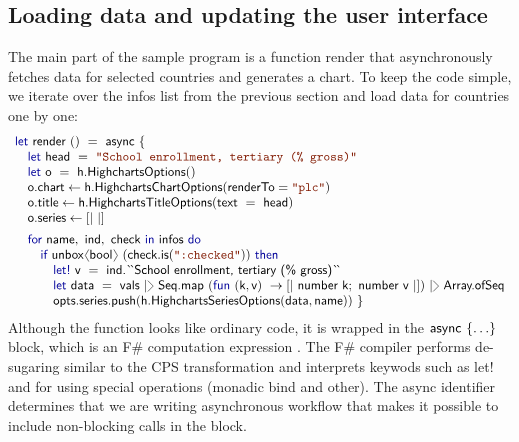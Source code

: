 \documentclass[submission,copyright,creativecommons]{eptcs}
\newcommand{\langl}{\begin{picture}(4.5,7)
\put(1.1,2.5){\rotatebox{60}{\line(1,0){5.5}}}
\put(1.1,2.5){\rotatebox{300}{\line(1,0){5.5}}}
\end{picture}}
\newcommand{\rangl}{\begin{picture}(4.5,7)
\put(.9,2.5){\rotatebox{120}{\line(1,0){5.5}}}
\put(.9,2.5){\rotatebox{240}{\line(1,0){5.5}}}
\end{picture}}
\newcommand{\rang}{\begin{picture}(5,7)
\put(.1,2.5){\rotatebox{135}{\line(1,0){6.0}}}
\put(.1,2.5){\rotatebox{225}{\line(1,0){6.0}}}
\end{picture}}
\newcommand{\kvd}[1]{\textnormal{\textcolor{kvdclr}{\sffamily #1}}}
\newcommand{\str}[1]{\textnormal{\textcolor{strclr}{\ttfamily "#1"}}}
\newcommand{\ident}[1]{\textnormal{\sffamily #1}}
\newcommand{\lident}[1]{\textnormal{\sffamily 
  \`{}\hspace{-0.25em}\`{}\hspace{-0.1em}#1\`{}\hspace{-0.25em}\`{}}}
\begin{document}

\subsection{Loading data and updating the user interface}

The main part of the sample program is a function \ident{render} that asynchronously fetches 
data for selected countries and generates a chart. To keep the code simple, we iterate over the 
\ident{infos} list from the previous section and load data for countries one by one:
%
\begin{equation*}
\begin{array}{lll}
 \kvd{let}~\ident{render}~()~=~\ident{async}~\{ \\
 \quad \kvd{let}~\ident{head}~=~\str{School enrollment, tertiary (\% gross)} \\
 \quad \kvd{let}~\ident{o}~=~\ident{h.HighchartsOptions}() \\
 \quad \ident{o.chart} \leftarrow \ident{h.HighchartsChartOptions}(\ident{renderTo}=\str{plc}) \\
 \quad \ident{o.title} \leftarrow \ident{h.HighchartsTitleOptions}(\ident{text}~=~\ident{head}) \\
 \quad \ident{o.series} \leftarrow \lbrack| ~ |\rbrack
 \\[0.5em]   
 \quad \kvd{for}~\ident{name},~\ident{ind},~\ident{check}~\kvd{in}~\ident{infos}~\kvd{do}\\
 \qquad   \kvd{if}~\ident{unbox}\langl \ident{bool} \rangl~(\ident{check.is}(\str{:checked}))~\kvd{then} \\
 \qquad\quad     \kvd{let!}~\ident{v}~=~\ident{ind.}\lident{School enrollment, tertiary (\% gross)} \\
 \qquad\quad     \kvd{let}~\ident{data}~=~\ident{vals}~
                   |\rang~\ident{Seq.map}~(\kvd{fun}~(\ident{k}, \ident{v})~\rightarrow \lbrack|~\ident{number~k};~\ident{number~v} ~|\rbrack)~
                   |\rang~\ident{Array.ofSeq} \\
 \qquad\quad     \ident{opts.series.push}(\ident{h.HighchartsSeriesOptions}(\ident{data}, \ident{name})) ~\}
\end{array}
\end{equation*}
%
Although the function looks like ordinary code, it is wrapped in the $\ident{async}~\{\ldots\}$ 
block, which is an F\# computation expression \cite{fsharp-zoo}. The F\# compiler performs 
de-sugaring similar to the CPS transformation and interprets keywods such as \kvd{let!} and 
\kvd{for} using special operations (monadic bind and other). The \ident{async} identifier 
determines that we are writing asynchronous workflow \cite{fsharp-async} that makes it 
possible to include non-blocking calls in the block.
\end{document}
